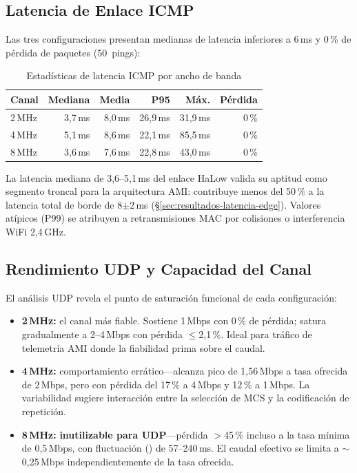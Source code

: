 \subsection{Latencia de Enlace ICMP}
\label{sec:resultados-halow-latencia}



Las tres configuraciones presentan medianas de latencia inferiores a 6\,ms y 0\,\% de pérdida de paquetes (50~pings):

\begin{table}[H]
\centering
\caption{Estadísticas de latencia ICMP por ancho de banda}
\label{tab:halow-latency-stats}
\small
\begin{tabular}{l r r r r r}
\toprule
\textbf{Canal} & \textbf{Mediana} & \textbf{Media} & \textbf{P95} & \textbf{Máx.} & \textbf{Pérdida} \\
\midrule
2\,MHz  & 3,7\,ms & 8,0\,ms & 26,9\,ms & 31,9\,ms & 0\,\% \\
4\,MHz  & 5,1\,ms & 8,6\,ms & 22,1\,ms & 85,5\,ms & 0\,\% \\
8\,MHz  & 3,6\,ms & 7,6\,ms & 22,8\,ms & 43,0\,ms & 0\,\% \\
\bottomrule
\end{tabular}
\end{table}

La latencia mediana de 3,6--5,1\,ms del enlace HaLow valida su aptitud como segmento troncal para la arquitectura AMI: contribuye menos del 50\,\% a la latencia total de borde de 8$\pm$2\,ms (§\ref{sec:resultados-latencia-edge}). Valores atípicos (P99) se atribuyen a retransmisiones MAC por colisiones o interferencia WiFi 2,4\,GHz.


\subsection{Rendimiento UDP y Capacidad del Canal}
\label{sec:resultados-halow-udp}



El análisis UDP revela el punto de saturación funcional de cada configuración:

\begin{itemize}
    \item \textbf{2\,MHz:} el canal más fiable. Sostiene 1\,Mbps con 0\,\% de pérdida; satura gradualmente a 2--4\,Mbps con pérdida $\leq$2,1\,\%. Ideal para tráfico de telemetría AMI donde la fiabilidad prima sobre el caudal.
    \item \textbf{4\,MHz:} comportamiento errático---alcanza pico de 1,56\,Mbps a tasa ofrecida de 2\,Mbps, pero con pérdida del 17\,\% a 4\,Mbps y 12\,\% a 1\,Mbps. La variabilidad sugiere interacción entre la selección de MCS y la codificación de repetición.
    \item \textbf{8\,MHz:} \textbf{inutilizable para UDP}---pérdida $>$45\,\% incluso a la tasa mínima de 0,5\,Mbps, con fluctuación () de 57--240\,ms. El caudal efectivo se limita a $\sim$0,25\,Mbps independientemente de la tasa ofrecida.
\end{itemize}


